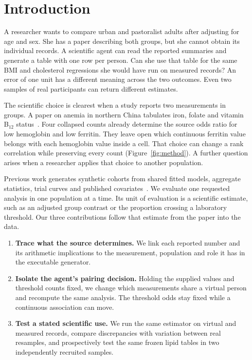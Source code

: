 \documentclass[sigconf,anonymous,review]{acmart}
\begin{document}
\section{Introduction}
A researcher wants to compare urban and pastoralist adults after adjusting for age and sex. She has a paper describing both groups, but she cannot obtain its individual records. A scientific agent can read the reported summaries and generate a table with one row per person. Can she use that table for the same BMI and cholesterol regressions she would have run on measured records? An error of one unit has a different meaning across the two outcomes. Even two samples of real participants can return different estimates.

The scientific choice is clearest when a study reports two measurements in groups. A paper on anemia in northern China tabulates iron, folate and vitamin B$_{12}$ status~\cite{zhu}. Four collapsed counts already determine the source odds ratio for low hemoglobin and low ferritin. They leave open which continuous ferritin value belongs with each hemoglobin value inside a cell. That choice can change a rank correlation while preserving every count (Figure~\ref{fig:method}). A further question arises when a researcher applies that choice to another population.

Previous work generates synthetic cohorts from shared fitted models, aggregate statistics, trial curves and published covariates~\cite{filshtein,llmsynthor,synthipd,kmgen}. We evaluate one requested analysis in one population at a time. Its unit of evaluation is a scientific estimate, such as an adjusted group contrast or the proportion crossing a laboratory threshold. Our three contributions follow that estimate from the paper into the data.
\begin{enumerate}
\item \textbf{Trace what the source determines.} We link each reported number and its arithmetic implications to the measurement, population and role it has in the executable generator.
\item \textbf{Isolate the agent's pairing decision.} Holding the supplied values and threshold counts fixed, we change which measurements share a virtual person and recompute the same analysis. The threshold odds stay fixed while a continuous association can move.
\item \textbf{Test a stated scientific use.} We run the same estimator on virtual and measured records, compare discrepancies with variation between real resamples, and prospectively test the same frozen lipid tables in two independently recruited samples.
\end{enumerate}
\end{document}
